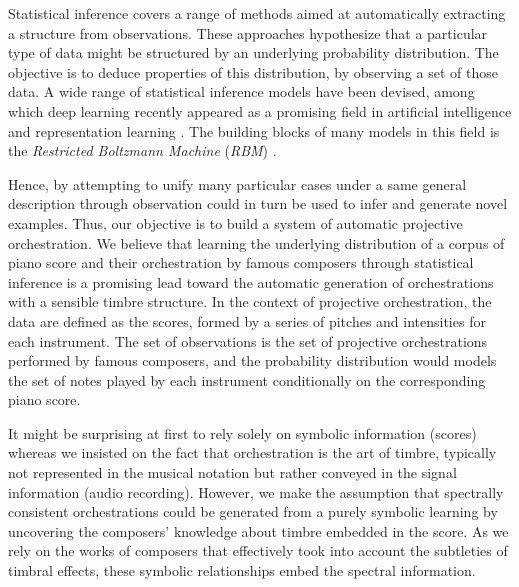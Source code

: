 \documentclass[letterpaper]{article}
\begin{document}
Statistical inference covers a range of methods aimed at automatically extracting a structure from observations. These approaches hypothesize that a particular type of data might be structured by an underlying probability distribution. The objective is to deduce properties of this distribution, by observing a set of those data. A wide range of statistical inference models have been devised, among which deep learning recently appeared as a  promising field in artificial intelligence and representation learning \cite{bengio2013representation,LeCun:2015aa}. The building blocks of many models in this field is the \textit{Restricted Boltzmann Machine} (\textit{RBM}) \cite{hinton2006fast}.

Hence,  by attempting to unify many particular cases under a same general description through observation could in turn be used to infer and generate novel examples.
Thus, our objective is to build a system of automatic projective orchestration. We believe that learning the underlying distribution of a corpus of piano score and their orchestration by famous composers through statistical inference is a promising lead toward the automatic generation of orchestrations with a sensible timbre structure.
In the context of projective orchestration, the data are defined as the scores, formed by a series of pitches and intensities for each instrument. The set of observations is the set of projective orchestrations performed by famous composers, and the probability distribution would models the set of notes played by each instrument conditionally on the corresponding piano score.

It might be surprising at first to rely solely on symbolic information (scores) whereas we insisted on the fact that orchestration is the art of timbre, typically not represented in the musical notation but rather conveyed in the signal information (audio recording). 
However, we make the assumption that spectrally consistent orchestrations could be generated from a purely symbolic learning by uncovering the composers' knowledge about timbre embedded in the score. As we rely on the works of composers that effectively took into account the subtleties of timbral effects, these symbolic relationships embed the spectral information.

\end{document}
